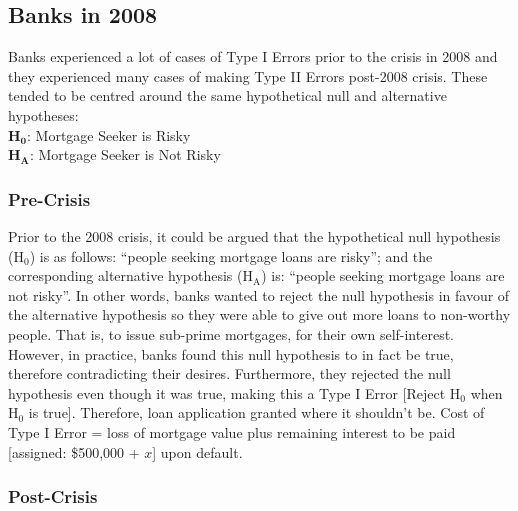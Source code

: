 \documentclass[11pt, english]{article}
\begin{document}
	\newpage

	\subsection{Banks in 2008}

	Banks experienced a lot of cases of Type I Errors prior to the crisis in 2008 and they experienced many cases of making Type II Errors post-2008 crisis. These tended to be centred around the same hypothetical null and alternative hypotheses:\\

	\textbf{H}$\mathbf{_0}$: Mortgage Seeker is Risky\\
	\textbf{H}$\mathbf{_A}$: Mortgage Seeker is Not Risky

		\subsubsection{Pre-Crisis}

	Prior to the 2008 crisis, it could be argued that the hypothetical null hypothesis (H$_0$) is as follows: ``people seeking mortgage loans are risky''; and the corresponding alternative hypothesis (H$\mathrm{_A}$) is: ``people seeking mortgage loans are not risky''. In other words, banks wanted to reject the null hypothesis in favour of the alternative hypothesis so they were able to give out more loans to non-worthy people. That is, to issue sub-prime mortgages, for their own self-interest. However, in practice, banks found this null hypothesis to in fact be true, therefore contradicting their desires. Furthermore, they rejected the null hypothesis even though it was true, making this a Type I Error [Reject H$_0$ when H$_0$ is true]. Therefore, loan application granted where it shouldn't be. Cost of Type I Error = loss of mortgage value plus remaining interest to be paid [assigned: \$500,000 + $x$] upon default.

		\subsubsection{Post-Crisis}
\end{document}
